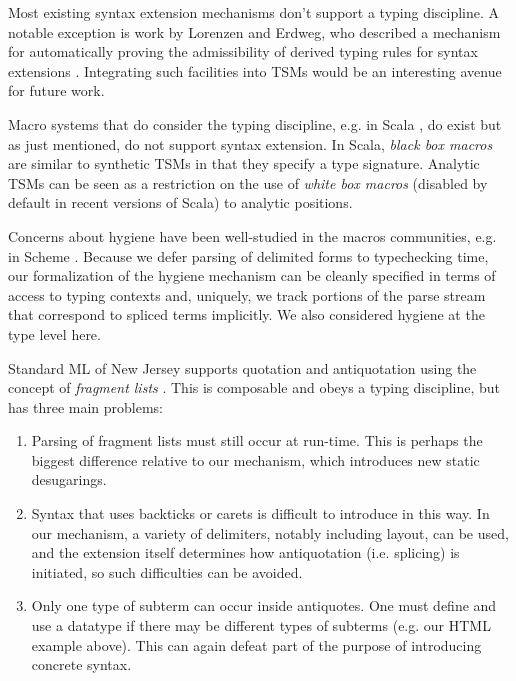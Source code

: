 \documentclass{sig-alternate}[10pt]
\newcommand{\lstinlinew}[1]{\lstinline[style=wyvern]{#1}}
\begin{document}
Most existing syntax extension mechanisms don't support a typing discipline. A notable exception is work by Lorenzen and Erdweg,  who described a mechanism for automatically proving the admissibility of derived typing rules for syntax extensions \cite{conf/icfp/LorenzenE13}. Integrating such facilities into TSMs would be an interesting avenue for future work. %


Macro systems that do consider the typing discipline, e.g. in Scala \cite{ScalaMacros2013}, do exist but as just mentioned, do not support syntax extension. In Scala, \emph{black box macros} are similar to synthetic TSMs in that they specify a type signature. Analytic TSMs can be seen as a restriction on the use of \emph{white box macros} (disabled by default in recent versions of Scala) to analytic positions. 

Concerns about hygiene have been well-studied in the macros communities, e.g. in Scheme \cite{Dybvig:1992:SAS:173617.173620}. Because we defer parsing of delimited forms to typechecking time, our formalization of the hygiene mechanism can be cleanly specified in terms of access to typing contexts and, uniquely, we track portions of the parse stream that correspond to spliced terms implicitly. We also considered hygiene at the type level here.

Standard ML of New Jersey supports quotation and antiquotation using the concept of \emph{fragment lists} \cite{SML/Quote}. %
This is composable and obeys a typing discipline, but has three main problems:
\vspace{-5px}\begin{enumerate}[noitemsep]
\item Parsing of fragment lists must still occur at run-time. This is perhaps the biggest difference relative to our mechanism, which introduces new static desugarings. %
\item Syntax that uses backticks or carets is difficult to introduce in this way. In our mechanism, a variety of delimiters, notably including layout, can be used, and the extension itself determines how antiquotation (i.e. splicing) is initiated, so such difficulties can be avoided.
\item Only one type of subterm can occur inside antiquotes. One must define and use a datatype if there may be different types of subterms (e.g. our HTML example above). This can again defeat part of the purpose of introducing concrete syntax.
\end{enumerate}
\end{document}
